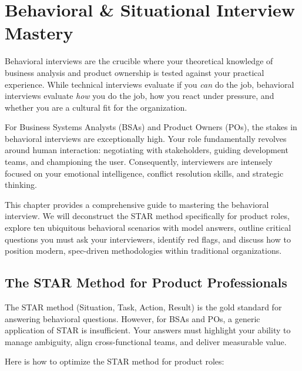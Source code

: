 \chapter{Behavioral \& Situational Interview
Mastery}\label{behavioral-situational-interview-mastery}

Behavioral interviews are the crucible where your theoretical knowledge
of business analysis and product ownership is tested against your
practical experience. While technical interviews evaluate if you
\emph{can} do the job, behavioral interviews evaluate \emph{how} you do
the job, how you react under pressure, and whether you are a cultural
fit for the organization.

For Business Systems Analysts (BSAs) and Product Owners (POs), the
stakes in behavioral interviews are exceptionally high. Your role
fundamentally revolves around human interaction: negotiating with
stakeholders, guiding development teams, and championing the user.
Consequently, interviewers are intensely focused on your emotional
intelligence, conflict resolution skills, and strategic thinking.

This chapter provides a comprehensive guide to mastering the behavioral
interview. We will deconstruct the STAR method specifically for product
roles, explore ten ubiquitous behavioral scenarios with model answers,
outline critical questions you must ask your interviewers, identify red
flags, and discuss how to position modern, spec-driven methodologies
within traditional organizations.

\bigskip

\section{The STAR Method for Product
Professionals}\label{the-star-method-for-product-professionals}

The STAR method (Situation, Task, Action, Result) is the gold standard
for answering behavioral questions. However, for BSAs and POs, a generic
application of STAR is insufficient. Your answers must highlight your
ability to manage ambiguity, align cross-functional teams, and deliver
measurable value.

Here is how to optimize the STAR method for product roles:

